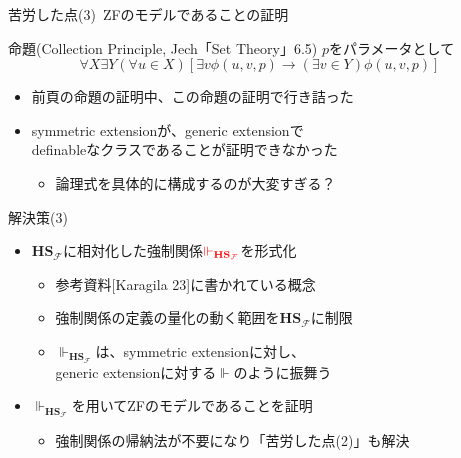 \documentclass[17pt,aspectratio=169]{beamer}
\newcommand{\Fcal}{\mathcal{F}}
\begin{document}
\begin{frame}{苦労した点(3)\, {\normalsize ZFのモデルであることの証明}}

    \begin{itembox}[l]{命題(Collection Principle, Jech「Set Theory」6.5)}
        {\small $p$をパラメータとして}
        \vspace{-10pt}
        $$\forall X \exists Y (\forall u \in X)[\exists v \phi(u, v, p) \rightarrow (\exists v \in Y) \phi(u, v, p)]$$
    \end{itembox}

    \vspace{-5pt}
    {\small
        \begin{itemize}[itemsep=5pt]
            \item 前頁の命題の証明中、この命題の証明で行き詰った
            \item symmetric extensionが、generic extensionで\\
                  definableなクラスであることが証明できなかった
                  \begin{itemize}
                    \item 論理式を具体的に構成するのが大変すぎる？
                  \end{itemize}
        \end{itemize}
    }

\end{frame}

\begin{frame}{解決策(3)}
    \vspace{-10pt}
    {\small
        \begin{itemize}[itemsep=8pt]
            \item $\bm{\mathbf{HS}}_{\Fcal}$に相対化した強制関係$\textcolor{red}{\Vdash_{\bm{\mathbf{HS}}_{\Fcal}}}$を形式化
                  \begin{itemize}
                      \item 参考資料[Karagila 23]に書かれている概念
                      \item 強制関係の定義の量化の動く範囲を$\bm{\mathbf{HS}}_{\Fcal}$に制限
                      \item $\Vdash_{\bm{\mathbf{HS}}_{\Fcal}}$は、symmetric extensionに対し、\\
                            generic extensionに対する$\Vdash$のように振舞う
                  \end{itemize}
            \item $\Vdash_{\bm{\mathbf{HS}}_{\Fcal}}$を用いてZFのモデルであることを証明
                  \begin{itemize}
                      \item 強制関係の帰納法が不要になり{\footnotesize「苦労した点(2)」}も解決
                  \end{itemize}
        \end{itemize}
    }
\end{frame}
\end{document}
